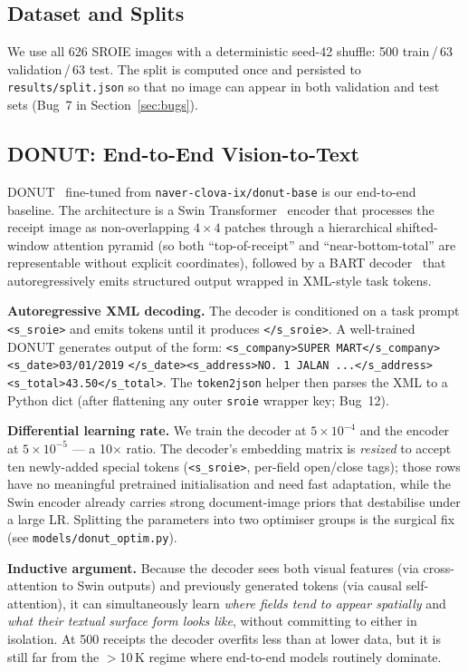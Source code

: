 \documentclass[conference]{IEEEtran}
\begin{document}
\subsection{Dataset and Splits}
We use all 626 SROIE images with a deterministic seed-42 shuffle:
500 train\,/\,63 validation\,/\,63 test.  The split is computed once
and persisted to \texttt{results/split.json} so that no image can
appear in both validation and test sets (Bug~7 in Section~\ref{sec:bugs}).

\subsection{DONUT: End-to-End Vision-to-Text}

DONUT~\cite{kim2022donut} fine-tuned from \texttt{naver-clova-ix/donut-base}
is our end-to-end baseline.  The architecture is a Swin
Transformer~\cite{liu2021swin} encoder that processes the receipt image
as non-overlapping $4{\times}4$ patches through a hierarchical
shifted-window attention pyramid (so both ``top-of-receipt'' and
``near-bottom-total'' are representable without explicit coordinates),
followed by a BART decoder~\cite{lewis2020bart} that
autoregressively emits structured output wrapped in XML-style task tokens.

\textbf{Autoregressive XML decoding.}
The decoder is conditioned on a task prompt
\texttt{<s\_sroie>} and emits tokens until it produces
\texttt{</s\_sroie>}.  A well-trained DONUT generates output of the form:
\texttt{<s\_company>SUPER MART</s\_company><s\_date>03/01/2019}
\texttt{</s\_date><s\_address>NO.~1 JALAN~...</s\_address>}
\texttt{<s\_total>43.50</s\_total>}.
The \texttt{token2json} helper then parses the XML to a Python dict
(after flattening any outer \texttt{sroie} wrapper key; Bug~12).

\textbf{Differential learning rate.}
We train the decoder at $5{\times}10^{-4}$ and the encoder at
$5{\times}10^{-5}$ --- a 10$\times$ ratio.  The decoder's embedding
matrix is \emph{resized} to accept ten newly-added special tokens
(\texttt{<s\_sroie>}, per-field open/close tags); those rows have no
meaningful pretrained initialisation and need fast adaptation, while
the Swin encoder already carries strong document-image priors that
destabilise under a large LR.  Splitting the parameters into two
optimiser groups is the surgical fix (see \texttt{models/donut\_optim.py}).

\textbf{Inductive argument.}
Because the decoder sees both visual features (via cross-attention to
Swin outputs) and previously generated tokens (via causal
self-attention), it can simultaneously learn \emph{where fields
tend to appear spatially} and \emph{what their textual surface form
looks like}, without committing to either in isolation.  At 500
receipts the decoder overfits less than at lower data, but it is still
far from the $>$10\,K regime where end-to-end models routinely dominate.
\end{document}
